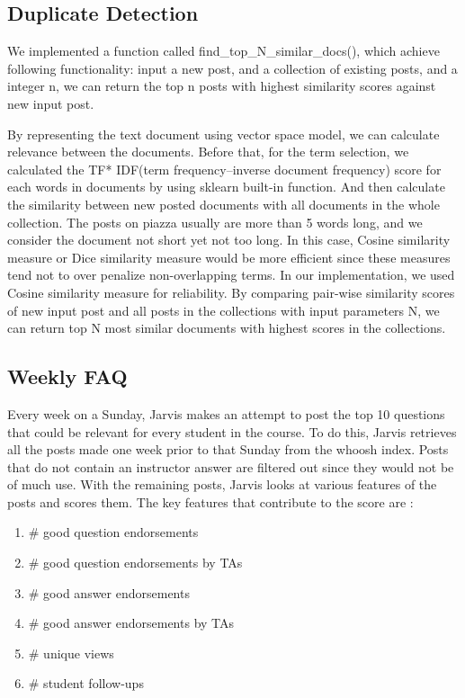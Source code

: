 \documentclass[sigconf]{acmart}
\begin{document}
\subsection{Duplicate Detection}
We implemented a function called find\_top\_N\_similar\_docs(), which achieve following functionality: input a new post, and a collection of existing posts, and a integer n, we can return the top n posts with highest similarity scores against new input post. 

By representing the text document using vector space model, we can calculate relevance between the documents. Before that, for the term selection, we calculated the TF* IDF(term frequency–inverse document frequency) score for each words in documents by using sklearn built-in function. And then calculate the similarity between new posted documents with all documents in the whole collection. The posts on piazza usually are more than 5 words long, and we consider the document not short yet not too long. In this case, Cosine similarity measure or Dice similarity measure would be more efficient since these measures tend not to over penalize non-overlapping terms. In our implementation, we used Cosine similarity measure for reliability. By comparing pair-wise similarity scores of new input post and all posts in the collections  with input parameters N, we can return top N most similar documents with highest scores in the collections. 


\subsection{Weekly FAQ}
Every week on a Sunday, Jarvis makes an attempt to post the top 10 questions that could be relevant for every student in the course. To do this, Jarvis retrieves all the posts made one week prior to that Sunday from the whoosh index. Posts that do not contain an instructor answer are filtered out since they would not be of much use. With the remaining posts, Jarvis looks at various features of the posts and scores them. The key features that contribute to the score are :

\begin{enumerate}
  \item \# good question endorsements
  \item \# good question endorsements by TAs
  \item \# good answer endorsements
  \item \# good answer endorsements by TAs
  \item \# unique views
  \item \# student follow-ups
\end{enumerate}
\end{document}
